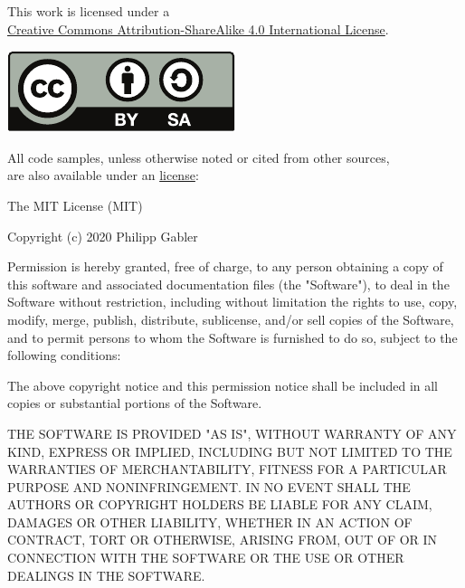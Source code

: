\begin{adjustwidth}{\absleftindent}{\absrightindent}
  \label{license}

  \abstracttextfont
  \begin{center}
    This work is licensed under a \\ \href{http://creativecommons.org/licenses/by-sa/4.0/}{Creative
      Commons Attribution-ShareAlike 4.0 International License}.
  \end{center}
  \begin{center}
    \includegraphics[scale=1]{figures/by-sa}
  \end{center}
  \begin{center}
    All code samples, unless otherwise noted or cited from other sources, \\ are also available under an
    \href{http://opensource.org/licenses/MIT}{ license}:
  \end{center}
  \vspace*{-1ex}
  \begin{ttfamily}
    \setlength{\parskip}{12pt}
    \setlength{\parindent}{0pt}
    The MIT License (MIT)

    Copyright (c) 2020 Philipp Gabler

    Permission is hereby granted, free of charge, to any person obtaining a copy of this software
    and associated documentation files (the "Software"), to deal in the Software without
    restriction, including without limitation the rights to use, copy, modify, merge, publish,
    distribute, sublicense, and/or sell copies of the Software, and to permit persons to whom the
    Software is furnished to do so, subject to the following conditions:

    The above copyright notice and this permission notice shall be included in all copies or
    substantial portions of the Software.

    THE SOFTWARE IS PROVIDED "AS IS", WITHOUT WARRANTY OF ANY KIND, EXPRESS OR IMPLIED, INCLUDING
    BUT NOT LIMITED TO THE WARRANTIES OF MERCHANTABILITY, FITNESS FOR A PARTICULAR PURPOSE AND
    NON\-IN\-FRINGE\-MENT. IN NO EVENT SHALL THE AUTHORS OR COPYRIGHT HOLDERS BE LIABLE FOR ANY
    CLAIM, DAMAGES OR OTHER LIABILITY, WHETHER IN AN ACTION OF CONTRACT, TORT OR OTHERWISE, ARISING
    FROM, OUT OF OR IN CONNECTION WITH THE SOFTWARE OR THE USE OR OTHER DEALINGS IN THE SOFTWARE.
  \end{ttfamily}
  

\end{adjustwidth}
